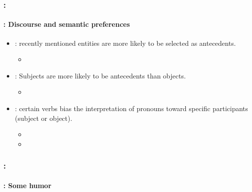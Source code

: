 \documentclass[xcolor=table]{beamer}
\begin{document}
\begin{frame}
	\frametitle{\insertshortsubtitle: \insertsection}
	\framesubtitle{\insertsubsection: Discourse and semantic preferences}
	
	\begin{itemize}
		
		\item {}: recently mentioned entities are more likely to be selected as antecedents.
		\begin{itemize}
			\item {}
		\end{itemize}
		
		\item {}: Subjects are more likely to be antecedents than objects.
		\begin{itemize}
			\item {}
		\end{itemize}
		
		\item {}: certain verbs bias the interpretation of pronouns toward specific participants (subject or object).
		\begin{itemize}
			\item {}
			\item {}
		\end{itemize}
	\end{itemize}
	
\end{frame}

\begin{frame}
	\frametitle{\insertshortsubtitle: \insertsection}
	\framesubtitle{\insertsubsection: Some humor}
	
	\begin{center}
	\end{center}
	
\end{frame}

\end{document}
